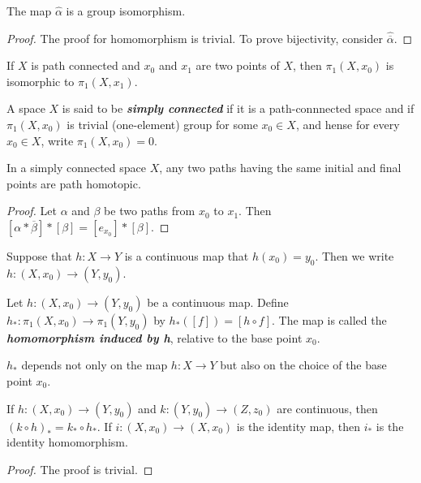 \begin{mytheorem}
The map $\hat{\alpha}$ is a group isomorphism.
\end{mytheorem}
\begin{proof}
The proof for homomorphism is trivial. To prove bijectivity, consider $\hat{\overline{\alpha}}$.
\end{proof}

\begin{mycorollary}
If $X$ is path connected and $x_0$ and $x_1$ are two points of $X$, then $\pi_1(X,x_0)$ is isomorphic to $\pi_1(X,x_1)$.
\end{mycorollary}

\begin{mydefinition}
A space $X$ is said to be \textbf{\emph{simply connected}} if it is a path-connnected space and if $\pi_1(X,x_0)$ is trivial (one-element) group for some $x_0\in X$, and hense for every $x_0\in X$, write $\pi_1(X,x_0)=0$.
\end{mydefinition}

\begin{mylemma}
In a simply connected space $X$, any two paths having the same initial and final points are path homotopic.
\end{mylemma}
\begin{proof}
Let $\alpha$ and $\beta$ be two paths from $x_0$ to $x_1$. Then $[\alpha*\overline{\beta}]*[\beta]=[e_{x_0}]*[\beta]$.
\end{proof}

\begin{notebox}
Suppose that $h: X\to Y$ is a continuous map that $h(x_0)=y_0$. Then we write $h:(X,x_0)\to (Y,y_0)$.
\end{notebox}

\begin{mydefinition}
Let $h:(X,x_0)\to (Y,y_0)$ be a continuous map. Define $h_*:\pi_1(X,x_0)\to \pi_1(Y,y_0)$ by $h_*([f])=[h\circ f]$. The map is called the \textbf{\emph{homomorphism induced by h}}, relative to the base point $x_0$.
\end{mydefinition}

\begin{remark}
$h_*$ depends not only on the map $h:X\to Y$ but also on the choice of the base point $x_0$.
\end{remark}

\begin{mytheorem}
If $h:(X,x_0)\to (Y,y_0)$ and $k:(Y,y_0)\to (Z,z_0)$ are continuous, then $(k\circ h)_*=k_*\circ h_*$. If $i:(X,x_0)\to (X,x_0)$ is the identity map, then $i_*$ is the identity homomorphism.
\end{mytheorem}
\begin{proof}
The proof is trivial.
\end{proof}


